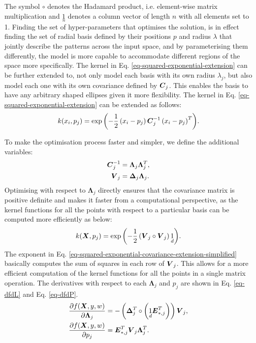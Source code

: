\documentclass[useAMS,usenatbib,fleqn]{mn2e}
\begin{document}
The symbol $\circ$ denotes the Hadamard product, i.e. element-wise matrix multiplication and $\underset{n}{1}$ denotes a column vector of length $n$ with all elements set to 1. Finding the set of hyper-parameters that optimises the solution, is in effect finding the set of radial basis defined by their positions $p$ and radius $\lambda$ that jointly describe the patterns across the input space, and by parameterising them differently, the model is more capable to accommodate different regions of the space more specifically. The kernel in Eq. \eqref{eq-squared-exponential-extension} can be further extended to, not only model each basis with its own radius $\lambda_{j}$, but also model each one with its own covariance defined by $\bmath{C}_{j}$. This enables the basis to have any arbitrary shaped ellipses given it more flexibility. The kernel in Eq. \eqref{eq-squared-exponential-extension} can be extended as follows:
\begin{equation}
\label{eq-squared-exponential-covariance-extension}
k(x_{i},p_{j}) = \exp{\left(-\frac{1}{2}\left(x_{i}-p_{j}\right)\bmath{C}_{j}^{-1}\left(x_{i}-p_{j}\right)^{T}\right)}.
\end{equation}

To make the optimisation process faster and simpler, we define the additional variables:
\begin{subequations}
\begin{align}
\label{eq-Cinv}
\bmath{C}_{j}^{-1} &= \mathbf\Lambda_{j}\mathbf\Lambda_{j}^{T},\\
\label{eq-V_j}
\bmath{V}_{j} &= \mathbf\Delta_{j}\mathbf\Lambda_{j}.
\end{align}
\end{subequations}
Optimising with respect to $\mathbf\Lambda_{j}$ directly ensures that the covariance matrix is positive definite and makes it faster from a computational perspective, as the kernel functions for all the points with respect to a particular basis can be computed more efficiently as below:
\begin{equation}
\label{eq-squared-exponential-covariance-extension-simplified}
k(\bmath{X},p_{j}) = \exp{\left(-\frac{1}{2}\left(\bmath{V}_{j}\circ \bmath{V}_{j}\right)\underset{d}{1}\right)}.
\end{equation}
The exponent in Eq. \eqref{eq-squared-exponential-covariance-extension-simplified} basically computes the sum of squares in each row of $\bmath{V}_{j}$. This allows for a more efficient computation of the kernel functions for all the points in a single matrix operation. The derivatives with respect to each $\mathbf\Lambda_{j}$ and $p_{j}$ are shown in Eq. \eqref{eq-dfdL} and Eq. \eqref{eq-dfdP}.
\begin{subequations}
\begin{align}
\label{eq-dfdL}
\frac{\partial f(\bmath{X},y,w)}{\partial \mathbf\Lambda_{j}} &= -\left( \mathbf\Delta_{j}^{T}\circ \left(\underset{d}{1}\bmath{E}_{*,j}^{T}\right) \right)\bmath{V}_{j},\\
\label{eq-dfdP}
\frac{\partial f(\bmath{X},y,w)}{\partial p_{j}} &= \bmath{E}_{*,j}^{T}\bmath{V}_{j}\mathbf\Lambda_{j}^{T}.
\end{align}
\end{subequations}
\end{document}
